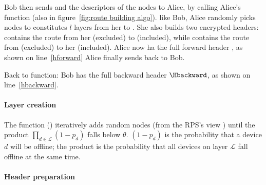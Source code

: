 Bob then sends \Hrecforward and the descriptors of the \LRV nodes to Alice, by calling Alice's \Send function (also in figure~\ref{fig:route building algo}).
like Bob, Alice randomly picks nodes to constitutes $l$ layers from her \squad to \LRV.
She also builds two encrypted headers: \Hsendforward contains the route from her \squad (excluded) to \LRV (included), while \Hsendbackward contains the route from \LRV (excluded) to her \squad (included).
Alice now ha the full forward header \Hforward, as shown on line~\ref{hforward}
Alice finally sends \Hsendbackward back to Bob.

Back to \Recv function: Bob has the full backward header $\Hbackward$, as shown on line~\ref{hbackward}.


\paragraph*{Layer creation}
The function \CreateOnionLayer() iteratively adds random nodes (from the RPS's view \view) until the product $\prod_{d\in \mathcal{L}} (1 - p_d)$ falls below $\theta$.
$(1 - p_d)$ is the probability that a device $d$ will be offline; the product is the probability that all devices on layer $\mathcal{L}$ fall offline at the same time.


\begin{table}[t]
\label{tab:parameters}
\end{table}


\paragraph*{Header preparation} 

